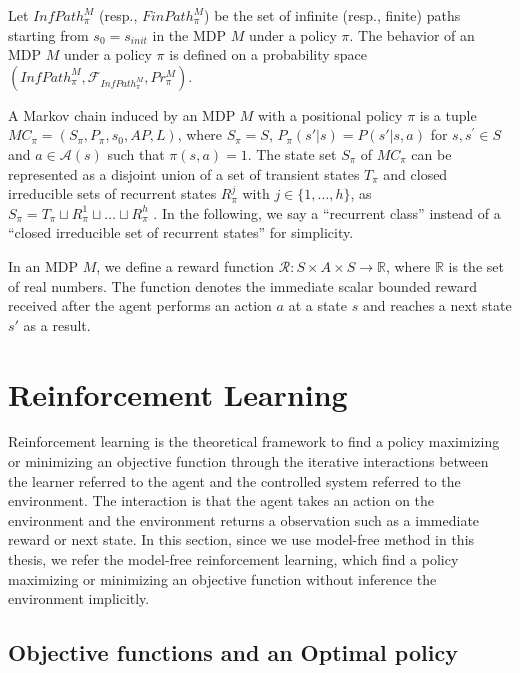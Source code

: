 Let $InfPath^{M}_{\pi}$ (resp., $FinPath^{M}_{\pi}$) be the set of infinite (resp., finite) paths starting from $s_0=s_{init}$ in the MDP $M$ under a policy $\pi$. The behavior of an MDP $M$ under a policy $\pi$ is defined on a probability space $(InfPath^{M}_{\pi}, \mathcal{F}_{InfPath^{M}_{\pi}}, Pr^{M}_{\pi})$. %

\begin{definition}
  A Markov chain induced by an MDP $M$ with a positional policy $\pi$ is a tuple $MC_{\pi} = (S_{\pi},P_{\pi},s_0,AP,L)$, where $S_{\pi} = S$, $P_{\pi}(s'|s) = P(s'|s,a)$ for $s, s^{\prime} \in S$ and $a \in \mathcal{A}(s)$ such that $\pi(s,a) = 1$.
  The state set $S_{\pi}$ of $MC_{\pi}$ can be represented as a disjoint union of a set of transient states $T_{\pi}$ and closed irreducible sets of recurrent states $R^j_{\pi}$ with $j \in \{ 1, \ldots ,h \}$, as $ S_{\pi} = T_{\pi} \sqcup R^1_{\pi} \sqcup \ldots \sqcup R^h_{\pi} $ \cite{ESS}.
  In the following, we say a ``recurrent class'' instead of a ``closed irreducible set of recurrent states'' for simplicity.
\end{definition}

In an MDP $M$, we define a reward function $\mathcal{R}:S \times A \times S \rightarrow \mathbb{R}$, where $\mathbb{R}$ is the set of real numbers. The function denotes the immediate scalar bounded reward received after the agent performs an action $a$ at a state $s$ and reaches a next state $s'$ as a result.

\section{Reinforcement Learning}

Reinforcement learning is the theoretical framework to find a policy maximizing or minimizing an objective function through the iterative interactions between the learner referred to the agent and the controlled system referred to the environment. The interaction is that the agent takes an action on the environment and the environment returns a observation such as a immediate reward or next state. In this section, since we use model-free method in this thesis, we refer the model-free reinforcement learning, which find a policy maximizing or minimizing an objective function without inference the environment implicitly.

\subsection{Objective functions and an Optimal policy}

